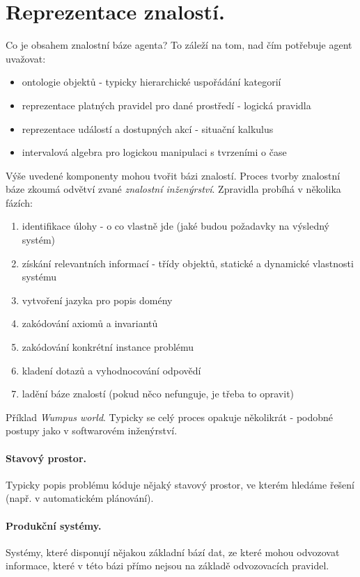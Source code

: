 \documentclass[a4paper]{article}      %
\begin{document}
\section{Reprezentace znalostí.}
Co je obsahem znalostní báze agenta? To záleží na tom, nad čím potřebuje agent uvažovat:
\begin{itemize}
\item ontologie objektů - typicky hierarchické uspořádání kategorií
\item reprezentace platných pravidel pro dané prostředí - logická pravidla
\item reprezentace událostí a dostupných akcí - situační kalkulus
\item intervalová algebra pro logickou manipulaci s tvrzeními o čase
\end{itemize}
Výše uvedené komponenty mohou tvořit bázi znalostí. Proces tvorby znalostní báze zkoumá odvětví zvané \emph{znalostní inženýrství}.
Zpravidla probíhá v několika fázích:
\begin{enumerate}
\item identifikace úlohy - o co vlastně jde (jaké budou požadavky na výsledný systém)
\item získání relevantních informací - třídy objektů, statické a dynamické vlastnosti systému
\item vytvoření jazyka pro popis domény
\item zakódování axiomů a invariantů
\item zakódování konkrétní instance problému
\item kladení dotazů a vyhodnocování odpovědí
\item ladění báze znalostí (pokud něco nefunguje, je třeba to opravit)
\end{enumerate}
Příklad \emph{Wumpus world}. Typicky se celý proces opakuje několikrát - podobné postupy jako v softwarovém inženýrství. 

\paragraph{Stavový prostor.}
Typicky popis problému kóduje nějaký stavový prostor, ve kterém hledáme řešení (např. v automatickém plánování). 

\paragraph{Produkční systémy.}
Systémy, které disponují nějakou základní bází dat, ze které mohou odvozovat informace, které v této bázi přímo nejsou
na základě odvozovacích pravidel.
\end{document}
